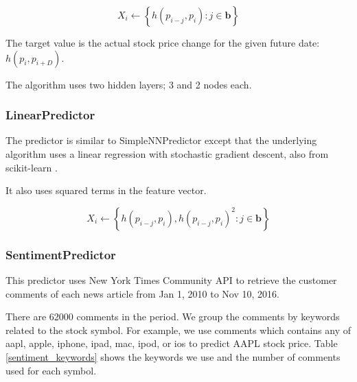 \documentclass[twocolumn,10pt]{asme2ej}
\newcommand{\vect}[1]{\boldsymbol{#1}}
\begin{document}
\[
X_i \gets \left\{h(p_{i - j}, p_i) : j \in \vect{b}\right\}
\]

The target value is the actual stock price change for the given
future date: $h(p_i, p_{i+D})$.

The algorithm uses two hidden layers; 3 and 2 nodes each.

\subsubsection{LinearPredictor}
The predictor is similar to SimpleNNPredictor except that the
underlying algorithm uses a linear regression with stochastic gradient
descent, also from scikit-learn \cite{web:scikit_learn}.

It also uses squared terms in the feature vector.

\[
X_i \gets \left\{h(p_{i-j}, p_i), h(p_{i-j}, p_i)^2 : j \in \vect{b}\right\}
\]

\subsubsection{SentimentPredictor}

This predictor uses New York Times Community API
\cite{web:nytimes_community_api} to retrieve the customer comments of
each news article from Jan 1, 2010 to Nov 10, 2016.

There are 62000 comments in the period. We group the comments by
keywords related to the stock symbol. For example, we use comments
which contains any of aapl, apple, iphone, ipad, mac, ipod, or ios to
predict AAPL stock price. Table \ref{sentiment_keywords} shows the
keywords we use and the number of comments used for each symbol.
\end{document}
